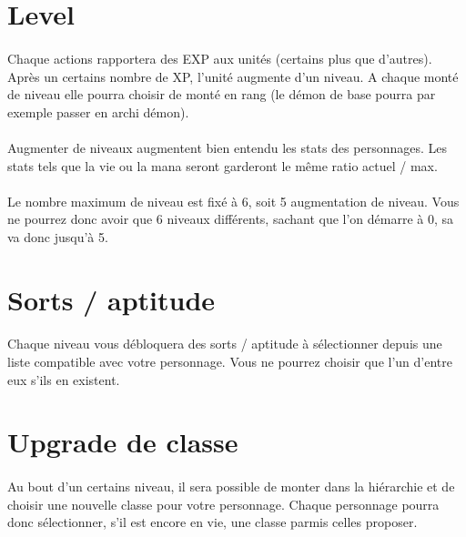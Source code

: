 \newpage
\section{Level}

\paragraph{} Chaque actions rapportera des EXP aux unités (certains plus que d'autres). Après un certains nombre de XP, l'unité augmente d'un niveau. A chaque monté de niveau elle pourra choisir de monté en rang (le démon de base pourra par exemple passer en archi démon).

\paragraph{} Augmenter de niveaux augmentent bien entendu les stats des personnages. Les stats tels que la vie ou la mana seront garderont le même ratio actuel / max.

\paragraph{} Le nombre maximum de niveau est fixé à 6, soit 5 augmentation de niveau. Vous ne pourrez donc avoir que 6 niveaux différents, sachant que l'on démarre à 0, sa va donc jusqu'à 5.

\section{Sorts / aptitude}

\paragraph{} Chaque niveau vous débloquera des sorts / aptitude à sélectionner depuis une liste compatible avec votre personnage. Vous ne pourrez choisir que l'un d'entre eux s'ils en existent.

\section{Upgrade de classe}

\paragraph{} Au bout d'un certains niveau, il sera possible de monter dans la hiérarchie et de choisir une nouvelle classe pour votre personnage. Chaque personnage pourra donc sélectionner, s'il est encore en vie, une classe parmis celles proposer.
